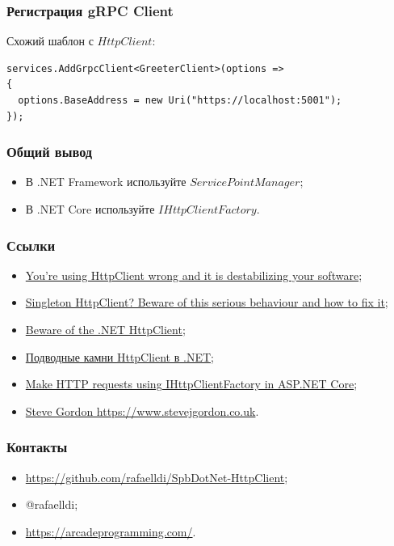 \documentclass[17pt,aspectratio=169]{beamer}
\begin{document}
\begin{frame}[fragile]
\frametitle{Регистрация gRPC Client}
Схожий шаблон с $HttpClient$:
\newline
\begin{lstlisting}
services.AddGrpcClient<GreeterClient>(options =>
{
  options.BaseAddress = new Uri("https://localhost:5001");
});
\end{lstlisting}
\end{frame}

\begin{frame}
\frametitle{Общий вывод}
\begin{itemize}
	\item В .NET Framework используйте $ServicePointManager$;
	\item В .NET Core используйте $IHttpClientFactory$.
\end{itemize}
\end{frame}

\begin{frame}
\frametitle{Ссылки}
\begin{itemize}
	\item \href{https://aspnetmonsters.com/2016/08/2016-08-27-httpclientwrong/}{You're using HttpClient wrong and it is destabilizing your software};
	\item \href{https://byterot.blogspot.com/2016/07/singleton-httpclient-dns.html}{Singleton HttpClient? Beware of this serious behaviour and how to fix it};
	\item \href{https://nima-ara-blog.azurewebsites.net/beware-of-the-net-httpclient/}{Beware of the .NET HttpClient};
	\item \href{https://habr.com/en/post/424873/}{Подводные камни HttpClient в .NET};
	\item \href{https://docs.microsoft.com/en-us/aspnet/core/fundamentals/http-requests?view=aspnetcore-2.2}{Make HTTP requests using IHttpClientFactory in ASP.NET Core};
	\item \href{https://www.stevejgordon.co.uk}{Steve Gordon https://www.stevejgordon.co.uk}.
\end{itemize}
\end{frame}

\begin{frame}
\frametitle{Контакты}
\begin{itemize}
	\item \href{Слайды и примеры https://github.com/rafaelldi/SpbDotNet-HttpClient}{https://github.com/rafaelldi/SpbDotNet-HttpClient};
	\item @rafaelldi;
	\item \href{https://arcadeprogramming.com/}{https://arcadeprogramming.com/}.
\end{itemize}
\end{frame}
\end{document}
